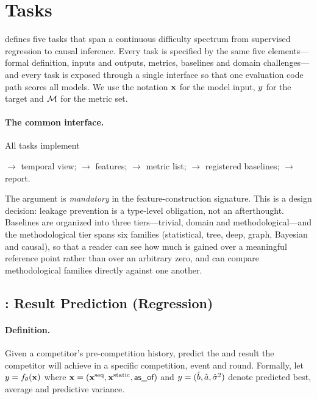 \section{Tasks}
\label{sec:tasks}

\wcabench{} defines five tasks that span a continuous difficulty spectrum from
supervised regression to causal inference. Every task is specified by the same
five elements---formal definition, inputs and outputs, metrics, baselines and
domain challenges---and every task is exposed through a single interface so
that one evaluation code path scores all models. We use the notation
$\mathbf{x}$ for the model input, $y$ for the target and $\mathcal{M}$ for the metric
set.

\paragraph{The common interface.}
All tasks implement
\begin{center}\small
{} $\to$ temporal view;\quad
{} $\to$ features;\quad
{} $\to$ metric list;\quad
{} $\to$ registered baselines;\quad
{} $\to$ report.
\end{center}
The \asof{} argument is \emph{mandatory} in the feature-construction signature.
This is a design decision: leakage prevention is a type-level obligation, not
an afterthought. Baselines are organized into three tiers---trivial, domain and
methodological---and the methodological tier spans six families (statistical,
tree, deep, graph, Bayesian and causal), so that a reader can see how much is
gained over a meaningful reference point rather than over an arbitrary zero, and
can compare methodological families directly against one another.

\subsection{: Result Prediction (Regression)}
\label{sec:task1}

\paragraph{Definition.}
Given a competitor's pre-competition history, predict the  and
 result the competitor will achieve in a specific competition,
event and round. Formally, let
$y = f_\theta(\mathbf{x})$ where
$\mathbf{x} = (\mathbf{x}^{\text{seq}}, \mathbf{x}^{\text{static}}, \textsf{as\_of})$ and
$y = (\hat{b}, \hat{a}, \hat{\sigma}^2)$ denote predicted best, average and
predictive variance.

